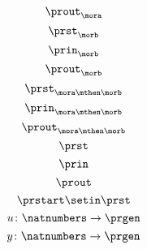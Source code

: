 {\begin{forslides}
        \begin{equation}
            \label{eq:mora-prout}
            \prout_{\mora}
        \end{equation}
        \begin{equation}
            \label{eq:morb-prst}
            \prst_{\morb}
        \end{equation}
        \begin{equation}
            \label{eq:morb-prin}
            \prin_{\morb}
        \end{equation}
        \begin{equation}
            \label{eq:morb-prout}
            \prout_{\morb}
        \end{equation}
        \begin{equation}
            \label{eq:morab-prst}
            \prst_{\mora\mthen\morb}
        \end{equation}
        \begin{equation}
            \label{eq:morab-prin}
            \prin_{\mora\mthen\morb}
        \end{equation}
        \begin{equation}
            \label{eq:morab-prout}
            \prout_{\mora\mthen\morb}
        \end{equation}
        \begin{equation}
            \label{eq:gen-prst}
            \prst
        \end{equation}
        \begin{equation}
            \label{eq:gen-prin}
            \prin
        \end{equation}
        \begin{equation}
            \label{eq:gen-prout}
            \prout
        \end{equation}
        \begin{equation}
            \label{eq:moore-start}
            \prstart \setin \prst
        \end{equation}
        \begin{equation}
            \label{eq:prgen-u}
            u\colon \natnumbers \to \prgen
        \end{equation}
        \begin{equation}
            \label{eq:prgen-y}
            y\colon \natnumbers \to \prgen
        \end{equation}

\end{forslides}}
